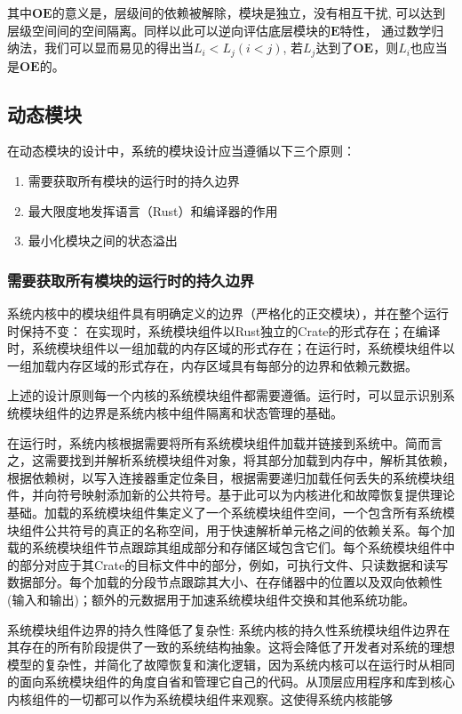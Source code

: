 其中$\boldsymbol{OE}$的意义是，层级间的依赖被解除，模块是独立，没有相互干扰, 可以达到层级空间间的空间隔离。同样以此可以逆向评估底层模块的$\boldsymbol{E}$特性， 通过数学归纳法，我们可以显而易见的得出当$L_{i} < L_{j} (i < j)$, 若$L_{j}$达到了$\boldsymbol{OE}$，则$L_{i}$也应当是$\boldsymbol{OE}$的。

\subsection{动态模块}

在动态模块的设计中，系统的模块设计应当遵循以下三个原则： \begin{enumerate}
    \item 需要获取所有模块的运行时的持久边界
    \item 最大限度地发挥语言（Rust）和编译器的作用
    \item 最小化模块之间的状态溢出
\end{enumerate}

\subsubsection{需要获取所有模块的运行时的持久边界}

系统内核中的模块组件具有明确定义的边界（严格化的正交模块），并在整个运行时保持不变： 在实现时，系统模块组件以Rust独立的Crate的形式存在；在编译时，系统模块组件以一组加载的内存区域的形式存在；在运行时，系统模块组件以一组加载内存区域的形式存在，内存区域具有每部分的边界和依赖元数据。

上述的设计原则每一个内核的系统模块组件都需要遵循。运行时，可以显示识别系统模块组件的边界是系统内核中组件隔离和状态管理的基础。

在运行时，系统内核根据需要将所有系统模块组件加载并链接到系统中。简而言之，这需要找到并解析系统模块组件对象，将其部分加载到内存中，解析其依赖，根据依赖树，以写入连接器重定位条目，根据需要递归加载任何丢失的系统模块组件，并向符号映射添加新的公共符号。基于此可以为内核进化和故障恢复提供理论基础。加载的系统模块组件集定义了一个系统模块组件空间，一个包含所有系统模块组件公共符号的真正的名称空间，用于快速解析单元格之间的依赖关系。每个加载的系统模块组件节点跟踪其组成部分和存储区域包含它们。每个系统模块组件中的部分对应于其Crate的目标文件中的部分，例如，可执行文件、只读数据和读写数据部分。每个加载的分段节点跟踪其大小、在存储器中的位置以及双向依赖性(输入和输出)；额外的元数据用于加速系统模块组件交换和其他系统功能。

系统模块组件边界的持久性降低了复杂性: 系统内核的持久性系统模块组件边界在其存在的所有阶段提供了一致的系统结构抽象。这将会降低了开发者对系统的理想模型的复杂性，并简化了故障恢复和演化逻辑，因为系统内核可以在运行时从相同的面向系统模块组件的角度自省和管理它自己的代码。从顶层应用程序和库到核心内核组件的一切都可以作为系统模块组件来观察。这使得系统内核能够

